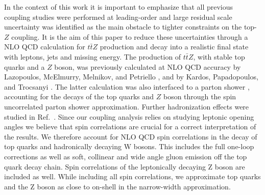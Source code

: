 \documentclass[preprint]{JHEP3} %
\def\Dphill{\Delta \phi_{ll}}
\def\ttbZ{t\bar{t}Z}
\def\ptZ{p_{t,Z}}
\begin{document}
In the context of this work it is important to emphasize that all previous coupling studies were performed at leading-order and large residual scale uncertainty 
was identified \cite{Baur:2004uw} as the main obstacle to tighter constraints on the top-$Z$ coupling.
It is the aim of this paper to reduce these uncertainties through a NLO QCD calculation for $\ttbZ$ production and decay into a realistic final state with leptons, jets and missing energy.
The production of $\ttbZ$, with stable top quarks and a $Z$ boson, was previously calculated at NLO QCD accuracy by Lazopoulos, McElmurry, Melnikov, and Petriello \cite{Lazopoulos:2008de}, and  by Kardos, Papadopoulos, and Trocsanyi \cite{Kardos:2011na}.
The latter calculation was also interfaced to a parton shower \cite{Garzelli:2011is}, accounting for the decays of the top quarks and $Z$ boson through the spin uncorrelated parton shower approximation.
Further hadronization effects were studied in Ref.~\cite{Garzelli:2012bn}.
Since our coupling analysis relies on studying leptonic opening angles we believe that spin correlations are crucial for a correct interpretation of the results.
We therefore account for NLO QCD spin correlations in the decay of top quarks and hadronically decaying W bosons.
This includes the full one-loop corrections as well as soft, collinear and wide angle gluon emission off the top quark decay chain.
Spin correlations of the leptonically decaying Z boson are included as well.
While including all spin correlations, we approximate top quarks and the Z boson as close to on-shell in the narrow-width approximation.
\end{document}
